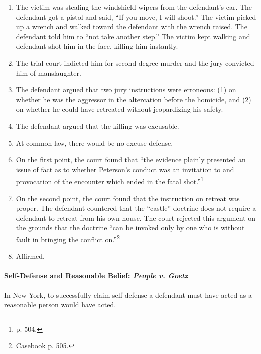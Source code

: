 \begin{enumerate}
    \item The victim was stealing the windshield wipers from the defendant's 
    car. The defendant got a pistol and said, ``If you move, I will shoot.'' 
    The victim picked up a wrench and walked toward the defendant with the 
    wrench raised. The defendant told him to ``not take another step.'' The 
    victim kept walking and defendant shot him in the face, killing him 
    instantly.
    \item The trial court indicted him for second-degree murder and the jury 
    convicted him of manslaughter.
    \item The defendant argued that two jury instructions were erroneous: (1) 
    on whether he was the aggressor in the altercation before the homicide, and 
    (2) on whether he could have retreated without jeopardizing his safety.
    \item The defendant argued that the killing was excusable.
    \item At common law, there would be no excuse defense.
    \item On the first point, the court found that ``the evidence plainly 
    presented an issue of fact as to whether Peterson's conduct was an 
    invitation to and provocation of the encounter which ended in the fatal 
    shot.''\footnote{p. 504.}
    \item On the second point, the court found that the instruction on retreat 
    was proper. The defendant countered that the ``castle'' doctrine does not 
    require a defendant to retreat from his own house. The court rejected this 
    argument on the grounds that the doctrine ``can be invoked only by one who 
    is without fault in bringing the conflict on.''\footnote{Casebook p. 505.}
    \item Affirmed.
\end{enumerate}

\paragraph{Self-Defense and Reasonable Belief: \emph{People v. Goetz}}

In New York, to successfully claim self-defense a defendant must have acted as 
a reasonable person would have acted.

